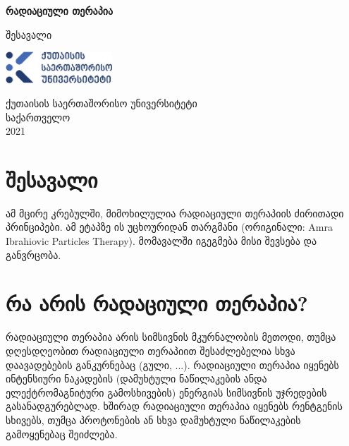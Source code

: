 \documentclass[12pt,a4paper,]{report}
\begin{document}
\begin{titlepage}
   \begin{center}
       \vspace*{1cm}

       \textbf{რადიაციული თერაპია}

       \vspace{0.5cm}
        შესავალი
            
       \vspace{1.5cm}

       \textbf{}

       \vfill
            
            
       \vspace{0.8cm}
     
       \includegraphics[width=0.3\textwidth]{images/kiu_logo}
            
       ქუთაისის საერთაშორისო უნივერსიტეტი\\
       საქართველო\\
       2021
            
   \end{center}
\end{titlepage}

\tableofcontents

\chapter{შესავალი}
ამ მცირე კრებულში, მიმოხილულია რადიაციული თერაპიის ძირითადი პრინციპები. ამ ეტაპზე ის უცხოურიდან თარგმანი (ორიგინალი: Amra Ibrahiovic Particles Therapy). მომავალში იგეგმება მისი შევსება და განვრცობა.

\pagebreak

\chapter{რა არის რადაციული თერაპია?}
რადიაციული თერაპია არის სიმსივნის მკურნალობის მეთოდი, თუმცა დღესდღეობით რადიაციული თერაპიით შესაძლებელია სხვა დაავადებების განკურნებაც (გული, ...). რადიაციული თერაპია იყენებს ინტენსიური ნაკადების (დამუხტული ნაწილაკების ანდა ელექტრომაგნიტური გამოსხივების) ენერგიას სიმსივნის უჯრედების გასანადგურებლად. ხშირად რადიაციული თერაპია იყენებს რენტგენის სხივებს, თუმცა პროტონების ან სხვა დამუხტული ნაწილაკების გამოყენებაც შეიძლება.
\end{document}
